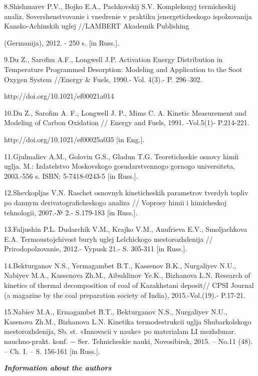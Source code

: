 \begin{noparindent}
8.Shishmarev P.V., Bojko E.A., Pachkovskij S.V. Kompleksnyj termicheskij
analiz. Sovershenstvovanie i vnedrenie v praktiku jenergeticheskogo
ispol\textquotesingle zovanija Kansko-Achinskih uglej //LAMBERT Akademik
Publishing

(Germanija), 2012. - 250 s. {[}in Russ.{]}.

9.Du Z., Sarofim A.F., Longwell J.P. Activation Energy Distribution in
Temperature Programmed Desorption: Modeling and Application to the Soot
Oxygen System //Energy \& Fuels, 1990.- Vol. 4(3).- P. 296--302.

http://doi.org/10.1021/ef00021a014

10.Du Z., Sarofim A. F., Longwell J. P., Mims C. A. Kinetic Measurement
and Modeling of Carbon Oxidation // Energy and Fuels, 1991. -Vol.5(1)-
P.214-221.

http://doi.org/10.1021/ef00025a035 {[}in Eng.{]}.

11.Gjul\textquotesingle maliev A.M., Golovin G.S., Gladun T.G.
Teoreticheskie osnovy himii uglja. M.: Izdatel\textquotesingle stvo
Moskovskogo gosudarstvennogo gornogo universiteta, 2003.-556 s. ISBN:
5-7418-0243-5 {[}in Russ.{]}.

12.Shevkopljas V.N. Raschet osnovnyh kineticheskih parametrov tverdyh
topliv po dannym derivatograficheskogo analiza // Voprosy himii i
himicheskoj tehnologii, 2007.-№ 2.- S.179-183 {[}in Russ.{]}.

13.Faljushin P.L. Dudarchik V.M., Krajko V.M., Anufrieva E.V.,
Smoljachkova E.A. Termoustojchivost\textquotesingle{} buryh uglej
Lel\textquotesingle chickogo mestorozhdenija //
Prirodopol\textquotesingle zovanie, 2012.- Vypusk 21.- S. 305-311 {[}in
Russ.{]}.

14.Bekturganov N.S., Yermagambet B.T., Kassenov B.K., Nurgaliyev N.U.,
Nabiyev M.A., Kassenova Zh.M., Aibuldinov Ye.K., Bizhanova L.N. Research
of kinetics of thermal decomposition of coal of Kazakhstani deposit//
CPSI Journal (a magazine by the coal preparation society of India),
2015.-Vol.(19).- P.17-21.

15.Nabiev M.A., Ermagambet B.T., Bekturganov N.S., Nurgaliyev N.U.,
Kasenova Zh.M., Bizhanova L.N. Kinetika termodestrukcii uglja
Shubarkol\textquotesingle skogo mestorozhdenija, Sb. st. «Innovacii v
nauke» po materialam LI mezhdunar. nauchno-prakt. konf. − Ser.
Tehnicheskie nauki, Novosibirsk, 2015. -- No.11 (48). -- Ch. I. -- S.
156-161 {[}in Russ.{]}.
\end{noparindent}

\emph{{\bfseries Information about the authors}}

